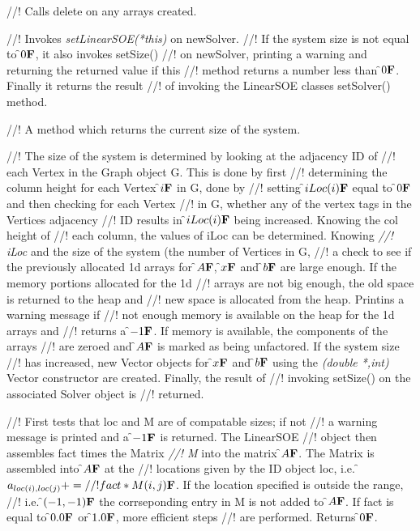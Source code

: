 //! Calls delete on any arrays created.

//! Invokes {\em setLinearSOE(*this)} on \p newSolver.
//! If the system size is not equal to \f$0{\bf F}$, it also invokes setSize()
//! on \p newSolver, printing a warning and returning the returned value if this
//! method returns a number less than \f$0{\bf F}$. Finally it returns the result
//! of invoking the LinearSOE classes setSolver() method.

//! A method which returns the current size of the system.

//! The size of the system is determined by looking at the adjacency ID of
//! each Vertex in the Graph object \p G. This is done by first
//! determining the column height for each Vertex \f$i{\bf F}$ in \p G, done by
//! setting \f$iLoc(i){\bf F}$ equal to \f$0{\bf F}$ and then checking for each Vertex
//! in \p G, whether any of the vertex tags in the Vertices adjacency
//! ID results in \f$iLoc(i){\bf F}$ being increased. Knowing the col height of
//! each column, the values of \p iLoc can be determined. Knowing {\em
//! iLoc} and the size of the system (the number of Vertices in \p G, 
//! a check to see if the previously allocated 1d arrays for \f$A{\bf F}$, \f$x{\bf F}$ and
\f$b{\bf F}$ are large enough. If the memory portions allocated for the 1d
//! arrays are not big enough, the old space is returned to the heap and
//! new space is allocated from the heap. Printins a warning message if
//! not enough memory is available on the heap for the 1d arrays and
//! returns a \f$-1{\bf F}$. If memory is available, the components of the arrays
//! are zeroed and \f$A{\bf F}$ is marked as being unfactored. If the system size
//! has increased, new Vector objects for \f$x{\bf F}$ and \f$b{\bf F}$ using the {\em
(double *,int)} Vector constructor are created. Finally, the result of 
//! invoking setSize() on the associated Solver object is
//! returned. 


//! First tests that \p loc and \p M are of compatable sizes; if not
//! a warning message is printed and a \f$-1{\bf F}$ is returned. The LinearSOE
//! object then assembles \p fact times the Matrix {\em 
//! M} into the matrix \f$A{\bf F}$. The Matrix is assembled into \f$A{\bf F}$ at the
//! locations given by the ID object \p loc, i.e. \f$a_{loc(i),loc(j)} +=
//! fact * M(i,j){\bf F}$. If the location specified is outside the range,
//! i.e. \f$(-1,-1){\bf F}$ the corrseponding entry in \p M is not added to
\f$A{\bf F}$. If \p fact is equal to \f$0.0{\bf F}$ or \f$1.0{\bf F}$, more efficient steps
//! are performed. Returns \f$0{\bf F}$.


